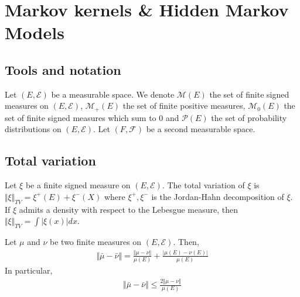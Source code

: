 \section{Markov kernels \& Hidden Markov Models}\label{sec:markov}


\subsection{Tools and notation}
Let $(E, \mathcal E)$ be a measurable space. We denote $\mathcal M(E)$ the set of finite signed measures on $(E, \mathcal E)$, $\mathcal M_+(E)$ the set of finite positive measures, $\mathcal M_0(E)$ the set of finite signed measures which sum to $0$ and $\mathcal P(E)$ the set of probability distributions on $(E, \mathcal E)$. Let $(F, \mathcal F)$ be a second measurable space.

\subsection{Total variation}

\begin{definition}
Let $\xi$ be a finite signed measure on $(E, \mathcal E)$. The total variation of $\xi$ is $\Vert \xi \Vert_{TV}= \xi^+(E) + \xi^-(X)$ where $\xi^+, \xi^-$ is the Jordan-Hahn decomposition of $\xi$. If $\xi$ admits a density with respect to the Lebesgue measure, then $\Vert \xi \Vert_{TV} = \int \vert \xi(x)\vert dx$.
\end{definition}
\begin{proposition}\label{prop:tv} Let $\mu$ and $\nu$ be two finite measures on $(E, \mathcal E)$. Then,
\begin{align}
    \Vert \bar \mu - \bar \nu \Vert = \frac{\Vert \mu - \nu \Vert}{\mu(E)} + \frac{\vert \mu(E) - \nu(E)\vert}{\mu(E)}
\end{align}
In particular,
\begin{align}
    \Vert \bar \mu - \bar \nu \Vert \leq \frac{2\Vert \mu - \nu \Vert}{\mu(E)}
\end{align}
\end{proposition}
